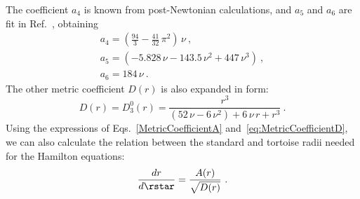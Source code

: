 \documentclass[twoside, aps, prd, letterpaper, noshowpacs, %
amsmath, amssymb, amsfonts, nofootinbib, floatfix, notitlepage]%
{revtex4-1}
\begin{document}
The coefficient $a_{4}$ is known from post-Newtonian calculations, and
$a_{5}$ and $a_{6}$ are fit in Ref.~\cite{PanEtAl:2011}, obtaining
\begin{subequations}
  \label{eq:a4a5a6values}
  \begin{gather}
    a_{4} = \left( \frac{94}{3} - \frac{41}{32}\, \pi^{2} \right)\,
    \nu~, \\
    a_{5} = (-5.828\,\nu - 143.5\,\nu^{2} + 447\,\nu^3)~, \\
    a_{6} = 184\, \nu~.
  \end{gather}
\end{subequations}
The other metric coefficient $D(r)$ is also expanded in \Pade form:
\begin{equation}
  \label{eq:MetricCoefficientD}
  D(r) = D_{3}^{0}(r) = \frac{r^{3}} {(52\,\nu - 6\,\nu^{2}) + 6\,
    \nu\, r + r^{3}}~.
\end{equation}
Using the expressions of Eqs.~\eqref{MetricCoefficientA}
and~\eqref{eq:MetricCoefficientD}, we can also calculate the relation
between the standard and tortoise radii needed for the Hamilton
equations:
\begin{equation}
  \label{eq:TortoiseRadius}
  \frac{dr}{d\rstar} = \frac{A(r)}{\sqrt{D(r)}}~.
\end{equation}
\end{document}
